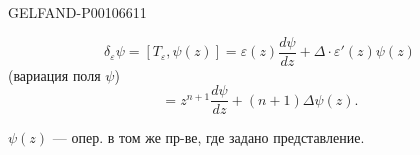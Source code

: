 \begin{GelfandAdjacentEvidence}{GELFAND-P001066}{11}

\begin{equation*}
\delta_\varepsilon\psi=[T_\varepsilon,\psi(z)]
 =\varepsilon(z)\frac{d\psi}{dz}+\Delta\cdot\varepsilon'(z)\psi(z)
\tag{21}
\end{equation*}
(вариация поля \(\psi\))
\begin{equation*}
[L_n,\psi(z)]
 =z^{n+1}\frac{d\psi}{dz}+(n+1)\Delta\psi(z).
\tag{22}
\end{equation*}
\end{GelfandAdjacentEvidence}


\(\psi(z)\) — опер. в том же пр-ве, где задано представление.


